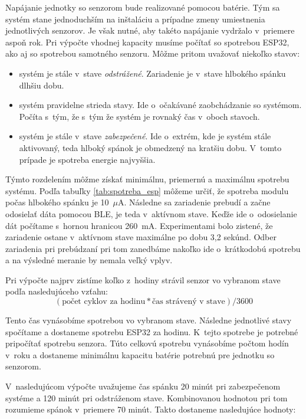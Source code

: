 Napájanie jednotky so senzorom bude realizované pomocou batérie. Tým sa systém stane jednoduchším na inštaláciu a prípadne zmeny umiestnenia jednotlivých senzorov. Je však nutné, aby takéto napájanie vydržalo v~priemere aspoň rok. Pri výpočte vhodnej kapacity musíme počítať so spotrebou ESP32, ako aj so spotrebou samotného senzoru. Môžme pritom uvažovať niekoľko stavov:
\begin{itemize}
    \item systém je stále v~stave \textit{odstrážené}. Zariadenie je v~stave hlbokého spánku dlhšiu dobu.
    \item systém pravidelne strieda stavy. Ide o~očakávané zaobchádzanie so systémom. Počíta s~tým, že s~tým že systém je rovnaký čas v~oboch stavoch.
    \item systém je stále v~stave \textit{zabezpečené}. Ide o~extrém, kde je systém stále aktivovaný, teda hlboký spánok je obmedzený na kratšiu dobu. V~tomto prípade je spotreba energie najvyššia.
\end{itemize}

Týmto rozdelením môžme získať minimálnu, priemernú a maximálnu spotrebu systému. Podľa tabuľky \ref{tab:spotreba_esp} môžeme určiť, že spotreba modulu počas hlbokého spánku je 10~$\mu$A. Následne sa zariadenie prebudí a začne odosielať dáta pomocou BLE, je teda v~aktívnom stave. Keďže ide o~odosielanie dát počítame s~hornou hranicou 260~mA. Experimentami bolo zistené, že zariadenie ostane v~aktívnom stave maximálne po dobu 3,2 sekúnd. Odber zariadenia pri prebúdzaní pri tom zanedbáme nakoľko ide o~krátkodobú spotrebu a na výsledné meranie by nemala veľký vplyv.

Pri výpočte najprv zistíme koľko z~hodiny strávil senzor vo vybranom stave podľa nasledujúceho vzťahu:
$$(\text{počet cyklov za hodinu} * \text{čas strávený v stave}) / 3600$$

Tento čas vynásobíme spotrebou vo vybranom stave. Následne jednotlivé stavy spočítame a dostaneme spotrebu ESP32 za hodinu. K~tejto spotrebe je potrebné pripočítať spotrebu senzora. Túto celkovú spotrebu vynásobíme počtom hodín v~roku a dostaneme minimálnu kapacitu batérie potrebnú pre jednotku so senzorom.

V~nasledujúcom výpočte uvažujeme čas spánku 20 minút pri zabezpečenom systéme a 120 minút pri odstráženom stave. Kombinovanou hodnotou pri tom rozumieme spánok v~priemere 70 minút. Takto dostaneme nasledujúce hodnoty:

